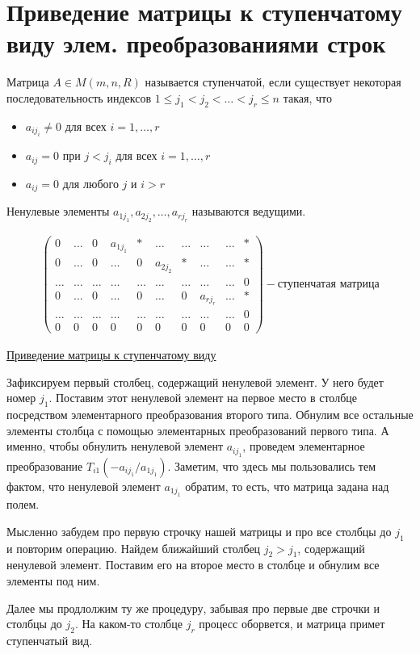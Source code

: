 \section{Приведение матрицы к ступенчатому виду элем. преобразованиями строк}
 \begin{conj}
     Матрица $A \in M(m, n, R)$ называется ступенчатой, если существует некоторая последовательность индексов 
     $1 \leq j_1 < j_2 < \dots < j_r \leq n$ такая, что
     \begin{itemize}
         \item $a_{ij_i} \neq 0$ для всех $i = 1, \dots, r$
         \item $a_{ij} = 0$ при $j < j_i$ для всех $i = 1, \dots, r$
         \item $a_{ij} = 0$ для любого $j$ и $i > r$
     \end{itemize}
     Ненулевые элементы $a_{1j_1}, a_{2j_2}, \dots, a_{rj_r}$ называются ведущими.
 \end{conj}

 \begin{gather*}
     \begin{pmatrix}
         0 & \dots & 0 & a_{1j_1} & * & \dots & \dots & \dots & \dots & * \\
         0 & \dots & 0 & \dots & 0 & a_{2j_2} & * & \dots & \dots & * \\
         \dots & \dots & \dots & \dots & \dots & \dots & \dots & \dots & \dots & 0 \\
         0 & \dots & 0 & \dots & 0 & \dots & 0 & a_{rj_r} & \dots & * \\
         \dots & \dots & \dots & \dots & \dots & \dots & \dots & \dots & \dots & 0 \\
        0 & 0 & 0 & 0 & 0 & 0 & 0 & 0 & 0 & 0
     \end{pmatrix} - \text{ступенчатая матрица}
 \end{gather*}

 \underline{Приведение матрицы к ступенчатому виду}

 Зафиксируем первый столбец, содержащий ненулевой элемент. 
 У него будет номер $j_1$.
 Поставим этот ненулевой элемент на первое место в столбце посредством элементарного преобразования второго типа.
 Обнулим все остальные элементы столбца с помощью элементарных преобразований первого типа.
 А именно, чтобы обнулить ненулевой элемент $a_{ij_1}$, проведем элементарное преобразование $T_{i1}(-a_{ij_1} / a_{1j_1})$.
 Заметим, что здесь мы пользовались тем фактом, что ненулевой элемент $a_{1j_1}$ обратим, то есть, что матрица задана над полем.

 Мысленно забудем про первую строчку нашей матрицы и про все столбцы до $j_1$ и повторим операцию.
 Найдем ближайший столбец $j_2 > j_1$, содержащий ненулевой элемент. 
 Поставим его на второе место в столбце и обнулим все элементы под ним.

 Далее мы продлолжим ту же процедуру, забывая про первые две строчки и столбцы до $j_2$. 
 На каком-то столбце $j_r$ процесс оборвется, и матрица примет ступенчатый вид. 